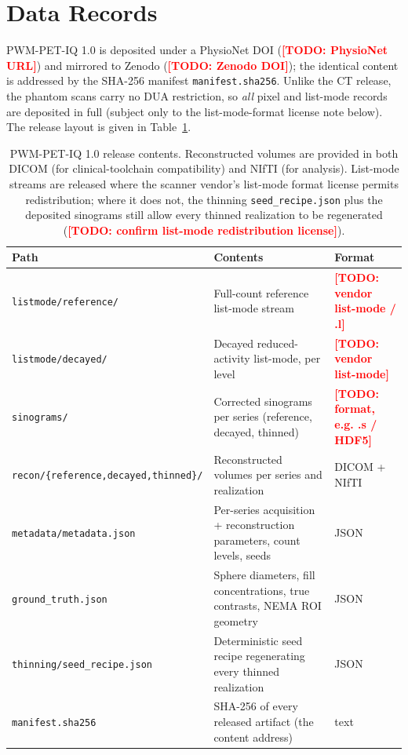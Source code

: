 \documentclass[twoside,11pt]{article}
\newcommand{\todo}[1]{\textcolor{red}{\textbf{[TODO: #1]}}}
\begin{document}
\section*{Data Records}

PWM-PET-IQ 1.0 is deposited under a PhysioNet DOI (\todo{PhysioNet URL}) and
mirrored to Zenodo (\todo{Zenodo DOI}); the identical content is addressed by the
SHA-256 manifest \texttt{manifest.sha256}. Unlike the CT release, the phantom scans
carry no DUA restriction, so \emph{all} pixel and list-mode records are deposited in
full (subject only to the list-mode-format license note below). The release layout is
given in Table~\ref{tab:data_records}.

\begin{table}[ht]
    \centering
    \small
    \setlength{\tabcolsep}{4pt}
    \begin{tabular}{@{}p{4.6cm}p{6.2cm}p{2.2cm}@{}}
        \toprule
        \textbf{Path} & \textbf{Contents} & \textbf{Format} \\
        \midrule
        \texttt{listmode/reference/}          & Full-count reference list-mode stream & \todo{vendor list-mode / .l} \\
        \texttt{listmode/decayed/}            & Decayed reduced-activity list-mode, per level & \todo{vendor list-mode} \\
        \texttt{sinograms/}                   & Corrected sinograms per series (reference, decayed, thinned) & \todo{format, e.g. .s / HDF5} \\
        \texttt{recon/\{reference,decayed,thinned\}/} & Reconstructed volumes per series and realization & DICOM + NIfTI \\
        \texttt{metadata/metadata.json}       & Per-series acquisition + reconstruction parameters, count levels, seeds & JSON \\
        \texttt{ground\_truth.json}           & Sphere diameters, fill concentrations, true contrasts, NEMA ROI geometry & JSON \\
        \texttt{thinning/seed\_recipe.json}   & Deterministic seed recipe regenerating every thinned realization & JSON \\
        \texttt{manifest.sha256}              & SHA-256 of every released artifact (the content address) & text \\
        \bottomrule
    \end{tabular}
    \caption{PWM-PET-IQ 1.0 release contents. Reconstructed volumes are provided in
    both DICOM (for clinical-toolchain compatibility) and NIfTI (for analysis).
    List-mode streams are released where the scanner vendor's list-mode format
    license permits redistribution; where it does not, the thinning
    \texttt{seed\_recipe.json} plus the deposited sinograms still allow every thinned
    realization to be regenerated (\todo{confirm list-mode redistribution license}).}
    \label{tab:data_records}
\end{table}
\end{document}
